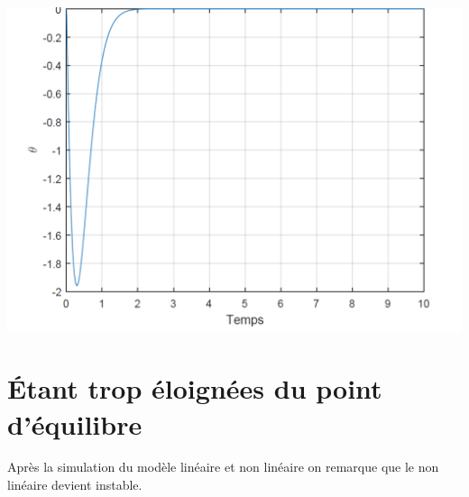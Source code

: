 \documentclass[12pt, a4paper, openany]{report}
\begin{document}
\begin{center}
{\includegraphics[scale=0.6]{fig5.png}} 
\label{fiig5}
\end{center}


    \section{Étant trop éloignées du point d'équilibre}
     
         Après la simulation du modèle linéaire et non linéaire on remarque que le non linéaire devient instable.\\
\end{document}
